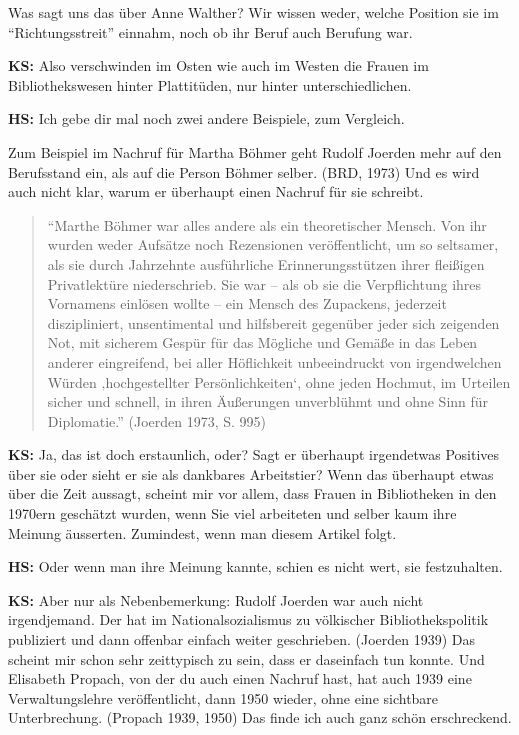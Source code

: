 \documentclass[a4paper,
fontsize=11pt,
oneside,
numbers=noperiodatend,
parskip=half-,
bibliography=totoc,
final
]{scrartcl}
\begin{document}
Was sagt uns das über Anne Walther? Wir wissen weder, welche Position
sie im \enquote{Richtungsstreit} einnahm, noch ob ihr Beruf auch
Berufung war.

\textbf{KS:} Also verschwinden im Osten wie auch im Westen die Frauen im
Bibliothekswesen hinter Plattitüden, nur hinter unterschiedlichen.

\textbf{HS:} Ich gebe dir mal noch zwei andere Beispiele, zum Vergleich.

Zum Beispiel im Nachruf für Martha Böhmer geht Rudolf Joerden mehr auf
den Berufsstand ein, als auf die Person Böhmer selber. (BRD, 1973) Und
es wird auch nicht klar, warum er überhaupt einen Nachruf für sie
schreibt.

\begin{quote}
\enquote{Marthe Böhmer war alles andere als ein theoretischer Mensch.
Von ihr wurden weder Aufsätze noch Rezensionen veröffentlicht, um so
seltsamer, als sie durch Jahrzehnte ausführliche Erinnerungsstützen
ihrer fleißigen Privatlektüre niederschrieb. Sie war -- als ob sie die
Verpflichtung ihres Vornamens einlösen wollte -- ein Mensch des
Zupackens, jederzeit diszipliniert, unsentimental und hilfsbereit
gegenüber jeder sich zeigenden Not, mit sicherem Gespür für das Mögliche
und Gemäße in das Leben anderer eingreifend, bei aller Höflichkeit
unbeeindruckt von irgendwelchen Würden ‚hochgestellter
Persönlichkeiten`, ohne jeden Hochmut, im Urteilen sicher und schnell,
in ihren Äußerungen unverblühmt und ohne Sinn für Diplomatie.} (Joerden
1973, S. 995)
\end{quote}

\textbf{KS:} Ja, das ist doch erstaunlich, oder? Sagt er überhaupt
irgendetwas Positives über sie oder sieht er sie als dankbares
Arbeitstier? Wenn das überhaupt etwas über die Zeit aussagt, scheint mir
vor allem, dass Frauen in Bibliotheken in den 1970ern geschätzt wurden,
wenn Sie viel arbeiteten und selber kaum ihre Meinung äusserten.
Zumindest, wenn man diesem Artikel folgt.

\textbf{HS:} Oder wenn man ihre Meinung kannte, schien es nicht wert,
sie festzuhalten.

\textbf{KS:} Aber nur als Nebenbemerkung: Rudolf Joerden war auch nicht
irgendjemand. Der hat im Nationalsozialismus zu völkischer
Bibliothekspolitik publiziert und dann offenbar einfach weiter
geschrieben. (Joerden 1939) Das scheint mir schon sehr zeittypisch zu
sein, dass er daseinfach tun konnte. Und Elisabeth Propach, von der du
auch einen Nachruf hast, hat auch 1939 eine Verwaltungslehre
veröffentlicht, dann 1950 wieder, ohne eine sichtbare Unterbrechung.
(Propach 1939, 1950) Das finde ich auch ganz schön erschreckend.
\end{document}
